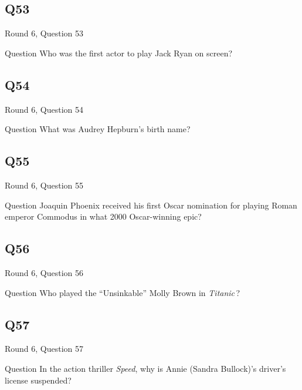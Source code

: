 \documentclass[11pt]{beamer}
\begin{document}
\subsection*{Q53}
\begin{frame}[t]{Round 6, Question 53}
\vspace{2em}
\begin{block}{Question}
Who was the first actor to play Jack Ryan on screen?
\end{block}
\end{frame}
    

\subsection*{Q54}
\begin{frame}[t]{Round 6, Question 54}
\vspace{2em}
\begin{block}{Question}
What was Audrey Hepburn's birth name?
\end{block}
\end{frame}
    

\subsection*{Q55}
\begin{frame}[t]{Round 6, Question 55}
\vspace{2em}
\begin{block}{Question}
Joaquin Phoenix received his first Oscar nomination for playing Roman emperor Commodus in what 2000 Oscar-winning epic?
\end{block}
\end{frame}
    

\subsection*{Q56}
\begin{frame}[t]{Round 6, Question 56}
\vspace{2em}
\begin{block}{Question}
Who played the ``Unsinkable'' Molly Brown in \emph{Titanic}\,?
\end{block}
\end{frame}
    

\subsection*{Q57}
\begin{frame}[t]{Round 6, Question 57}
\vspace{2em}
\begin{block}{Question}
In the action thriller \emph{Speed}, why is Annie (Sandra Bullock)'s driver's license suspended?
\end{block}
\end{frame}
    
\end{document}
